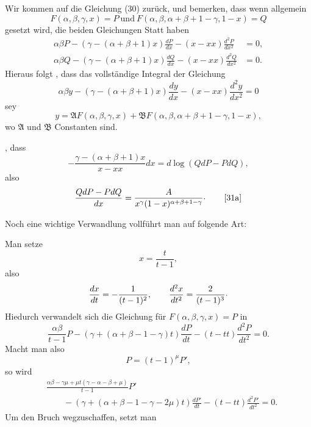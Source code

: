 \begingroup
\makeatletter\tagsleft@true\let\veqno\@@leqno\makeatother
{}
\noindent{\small[S. 45]}\par
\indent Wir kommen auf die Gleichung (30) zurück, und bemerken, dass wenn allgemein
\[F(\alpha,\beta,\gamma,x)=P\ \text{und}\ F(\alpha,\beta,\alpha+\beta+1-\gamma,1-x)=Q\]
\noindent gesetzt wird, die beiden Gleichungen Statt haben
\[\begin{aligned}
\alpha\beta P-(\gamma-(\alpha+\beta+1)x)\frac{dP}{dx}-(x-xx)\frac{d^2P}{dx^2}&=0,\\[.6em]
\alpha\beta Q-(\gamma-(\alpha+\beta+1)x)\frac{dQ}{dx}-(x-xx)\frac{d^2Q}{dx^2}&=0.
\end{aligned}\]
\noindent Hieraus folgt , dass das vollständige Integral der Gleichung
\[\alpha\beta y-(\gamma-(\alpha+\beta+1)x)\frac{dy}{dx}-(x-xx)\frac{d^2y}{dx^2}=0\]
\noindent sey
\[y=\mathfrak{A}F(\alpha,\beta,\gamma,x)+\mathfrak{B}F(\alpha,\beta,\alpha+\beta+1-\gamma,1-x),\]
\noindent wo $\mathfrak{A}$ und $\mathfrak{B}$ Constanten sind.
\par\smallskip\noindent{\small[S. 46]}\par
\indent{}, dass
\[-\frac{\gamma-(\alpha+\beta+1)x}{x-xx}dx=d\log(QdP-PdQ),\]
\noindent also
\begin{equation}
\frac{QdP-PdQ}{dx}=\frac{A}{x^\gamma(1-x)^{\alpha+\beta+1-\gamma}}\mathpunct{\raisebox{.35ex}{.}}\tag*{[31a]}
\end{equation}
\clearpage{}
\par\indent Noch eine wichtige Verwandlung vollführt man auf folgende Art:
\par\indent Man setze
\[x=\frac{t}{t-1},\]
\noindent also
\[\frac{dx}{dt}=-\frac{1}{(t-1)^2},\qquad\frac{d^2x}{dt^2}=\frac{2}{(t-1)^3}\mathpunct{\raisebox{.35ex}{.}}\]
\noindent Hiedurch verwandelt sich die Gleichung für $F(\alpha,\beta,\gamma,x)=P$ in
\[\frac{\alpha\beta}{t-1}P-(\gamma+(\alpha+\beta-1-\gamma)t)\frac{dP}{dt}-(t-tt)\frac{d^2P}{dt^2}=0.\]
\noindent Macht man also
\[P=(t-1)^\mu P',\]
\noindent so wird
\[\begin{aligned}
&\frac{\alpha\beta-\gamma\mu+\mu t(\gamma-\alpha-\beta+\mu)}{t-1}P'\\
&\qquad-(\gamma+(\alpha+\beta-1-\gamma-2\mu)t)\frac{dP'}{dt}-(t-tt)\frac{d^2P'}{dt^2}=0.
\end{aligned}\]
\noindent Um den Bruch wegzuschaffen, setzt man

